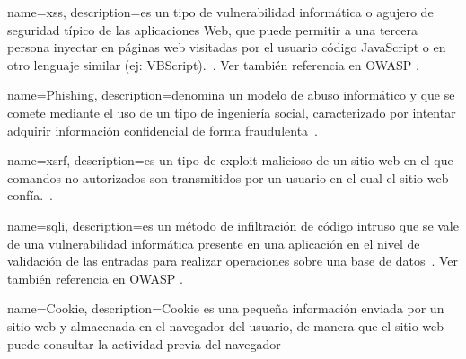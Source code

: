 {
    name=\acrlong{xss},
    description={es un tipo de vulnerabilidad informática o agujero de seguridad típico de las aplicaciones Web, que puede permitir a una tercera persona inyectar en páginas web visitadas por el usuario código JavaScript o
    en otro lenguaje similar (ej: VBScript).~\cite[Wikipedia]{wiki:xss}. Ver también referencia en OWASP \cite{owaspxss}.}
}

{
    name=Phishing,
    description={denomina un modelo de abuso informático y que se comete mediante el uso de un tipo de ingeniería social, caracterizado por intentar adquirir información confidencial de forma
    fraudulenta~\cite[Wikipedia]{wiki:Phishing}}.
}

{
    name=\acrlong{xsrf},
    description={es un tipo de exploit malicioso de un sitio web en el que comandos no autorizados son transmitidos por un usuario en el cual el sitio web confía.~\cite[Wikipedia]{wiki:XSRF}}.
}

{
    name=\acrlong{sqli},
    description={es un método de infiltración de código intruso que se vale de una vulnerabilidad informática presente en una aplicación en el nivel de validación de las entradas para realizar operaciones sobre una base de
    datos~\cite[Wikipedia]{wiki:sqli}. Ver también referencia en OWASP \cite{owaspsqli}.}
}

{
    name=Cookie,
    description={Cookie es una pequeña información enviada por un sitio web y almacenada en el navegador del usuario, de manera que el sitio web puede consultar la actividad previa del navegador~\cite[Wikipedia]{wiki:cookie}}
}


